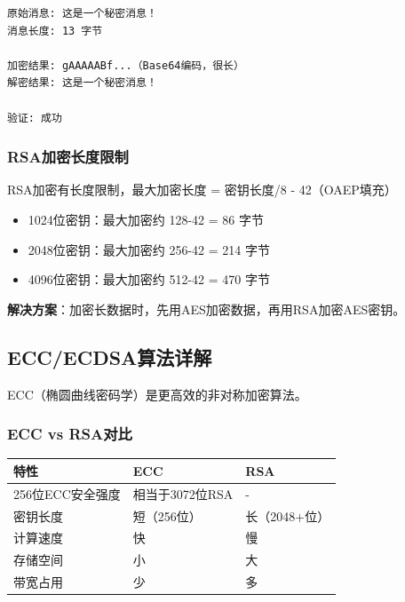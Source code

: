 \documentclass[12pt,a4paper]{article}
\begin{document}
\begin{notebox}[运行结果]
\begin{verbatim}
原始消息: 这是一个秘密消息！
消息长度: 13 字节

加密结果: gAAAAABf...（Base64编码，很长）
解密结果: 这是一个秘密消息！

验证: 成功
\end{verbatim}
\end{notebox}

\subsubsection{RSA加密长度限制}

\begin{keybox}[重要限制]
RSA加密有长度限制，最大加密长度 = 密钥长度/8 - 42（OAEP填充）
\begin{itemize}
\item 1024位密钥：最大加密约 128-42 = 86 字节
\item 2048位密钥：最大加密约 256-42 = 214 字节
\item 4096位密钥：最大加密约 512-42 = 470 字节
\end{itemize}
\textbf{解决方案}：加密长数据时，先用AES加密数据，再用RSA加密AES密钥。
\end{keybox}

\subsection{ECC/ECDSA算法详解}

ECC（椭圆曲线密码学）是更高效的非对称加密算法。

\subsubsection{ECC vs RSA对比}

\begin{center}
\begin{tabular}{|l|l|l|}
\hline
\textbf{特性} & \textbf{ECC} & \textbf{RSA} \\
\hline
256位ECC安全强度 & 相当于3072位RSA & - \\
\hline
密钥长度 & 短（256位） & 长（2048+位） \\
\hline
计算速度 & 快 & 慢 \\
\hline
存储空间 & 小 & 大 \\
\hline
带宽占用 & 少 & 多 \\
\hline
\end{tabular}
\end{center}
\end{document}
